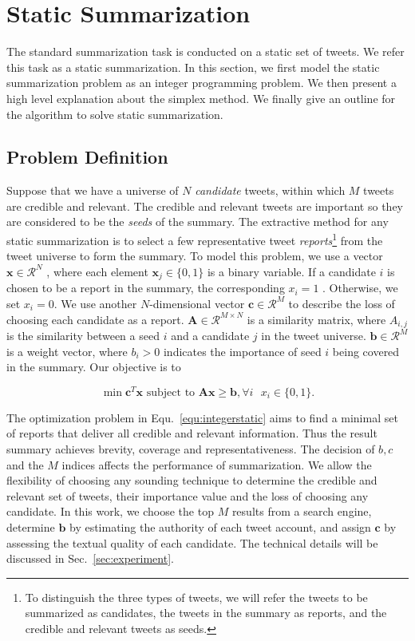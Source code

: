\documentclass{llncs}
\begin{document}
\section{Static Summarization}\label{sec:static}
%
The standard summarization task is conducted on a static set of tweets. We refer this task as a static summarization. In this section, we first model the static summarization problem as an integer programming problem. We then present a high level explanation about the simplex method. We finally give an outline for the algorithm to solve static summarization.
\subsection{Problem Definition}
Suppose that we have a universe of $N$ \emph{candidate} tweets, within which $M$ tweets are credible and relevant. The credible and relevant tweets are important so they are considered to be the \emph{seeds} of the summary. The extractive method for any static summarization is to select a few representative tweet \emph{reports}\footnote{To distinguish the three types of tweets, we will refer the tweets to be summarized as candidates, the tweets in the summary as reports, and the credible and relevant tweets as seeds.} from the tweet universe to form the summary. To model this problem, we use a vector $\mathbf{x}\in \mathcal{R}^N$ , where each element $\mathbf{x}_j\in \{0,1\}$ is a binary variable. If a candidate  $i$ is chosen to be a report in the summary, the corresponding $x_i=1$ . Otherwise, we set  $x_i=0$. We use another $N$-dimensional vector $\mathbf{c}\in \mathcal{R}^M$ to describe the loss of choosing each candidate as a report. $\mathbf{A}\in\mathcal{R}^{M\times N}$  is a similarity matrix, where $A_{i,j}$  is the similarity between a seed $i$ and a candidate $j$ in the tweet universe. $\mathbf{b}\in \mathcal{R}^{M}$ is a weight vector, where $b_{i}>0$ indicates the importance of seed $i$ being covered in the summary. Our objective is to

\begin{equation}\label{equ:integerstatic}
\min \mathbf{c}^T \mathbf{x} \textrm{ subject to } \mathbf{A} \mathbf{x} \geq \mathbf{b}, \forall i\textrm{ } x_i\in \{0,1\}.
\end{equation}

The optimization problem in Equ.~\ref{equ:integerstatic} aims to find a minimal set of reports that deliver all credible and relevant information. Thus the result summary achieves brevity, coverage and representativeness. The decision of $b,c$ and the $M$ indices affects the performance of summarization. We allow the flexibility of choosing any sounding technique to determine the credible and relevant set of tweets, their importance value and the loss of choosing any candidate. In this work,  we  choose the top $M$ results from a search engine, determine $\mathbf{b}$  by estimating  the authority of each tweet account, and assign $\mathbf{c}$ by assessing the textual quality of each candidate. The technical details will be discussed in Sec.~\ref{sec:experiment}.
\end{document}
